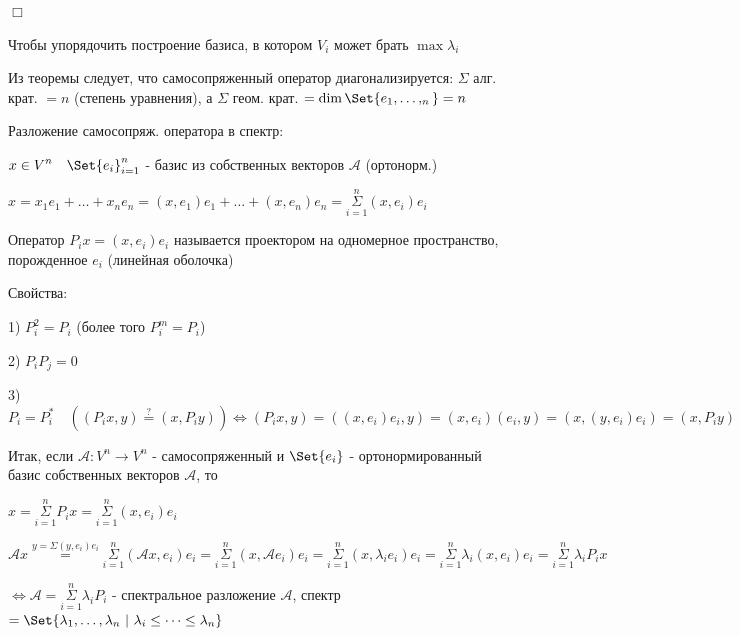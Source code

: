 \documentclass[12pt]{article}
\begin{document}
    $\Box$

    \Nota Чтобы упорядочить построение базиса, в котором $\displaystyle V_i$ может брать $\displaystyle \max \lambda_i$

    \Nota Из теоремы следует, что самосопряженный оператор диагонализируется: $\displaystyle \Sigma$ алг. крат. $ = n$ (степень уравнения), а $\displaystyle \Sigma$ геом. крат. $\displaystyle = \dim \Set{e_1, \dots, _n} = n$


    Разложение самосопряж. оператора в спектр:

    $\displaystyle x \in V^n \quad \Set{e_i}_{i=1}^n$ - базис из собственных векторов $\mathcal{A}$ (ортонорм.)

    $\displaystyle x = x_1 e_1 + \dots + x_n e_n = (x, e_1) e_1 + \dots + (x, e_n) e_n = \overset{n}{\underset{i = 1}{\Sigma}} (x, e_i) e_i$

    \Def Оператор $\displaystyle P_i x = (x, e_i) e_i$ называется проектором на одномерное пространство, порожденное $\displaystyle e_i$ (линейная оболочка)

    Свойства:

    1) $\displaystyle P_i^2 = P_i$ (более того $\displaystyle P^m_i = P_i$)

    2) $\displaystyle P_i P_j = 0$

    3) $\displaystyle P_i = P_i^* \quad ((P_i x, y) \stackrel{?}{=} (x, P_i y)) \Longleftrightarrow (P_i x, y) = ((x, e_i) e_i, y) = (x, e_i) (e_i, y) = (x, (y, e_i) e_i) = (x, P_i y)$

    Итак, если $\displaystyle \mathcal{A}: V^n \to V^n$ - самосопряженный и $\displaystyle \Set{e_i}$ - ортонормированный базис собственных векторов $\mathcal{A}$, то

    $\displaystyle x = \overset{n}{\underset{i = 1}{\Sigma}} P_i x = \overset{n}{\underset{i = 1}{\Sigma}} (x, e_i) e_i$

    $\displaystyle \mathcal{A} x \stackrel{y = \Sigma (y, e_i) e_i}{=} \overset{n}{\underset{i = 1}{\Sigma}} (\mathcal{A}x, e_i) e_i =
    \overset{n}{\underset{i = 1}{\Sigma}} (x, \mathcal{A}e_i) e_i = \overset{n}{\underset{i = 1}{\Sigma}} (x, \lambda_i e_i) e_i =
    \overset{n}{\underset{i = 1}{\Sigma}} \lambda_i (x, e_i) e_i = \overset{n}{\underset{i = 1}{\Sigma}} \lambda_i P_i x$

    $\displaystyle \Longleftrightarrow \mathcal{A} = \overset{n}{\underset{i = 1}{\Sigma}} \lambda_i P_i$ - спектральное разложение $\mathcal{A}$,
    спектр $\displaystyle = \Set{\lambda_1, \dots, \lambda_n \ | \ \lambda_i \leq \dots \leq \lambda_n}$
\end{document}
